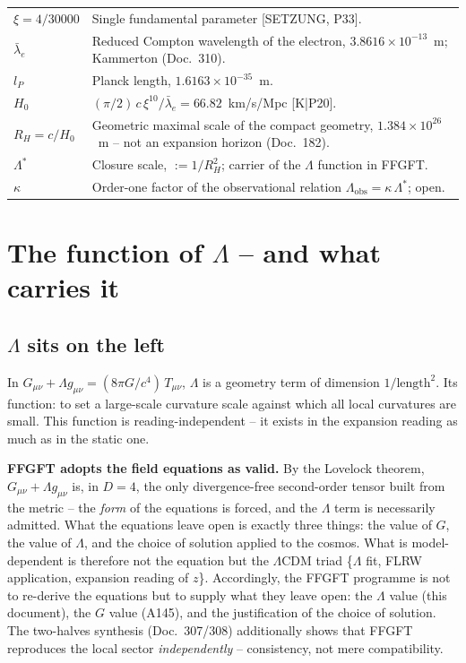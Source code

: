 \medskip
\begin{tabular}{@{}lp{10.5cm}}
$\xi = 4/30000$ & Single fundamental parameter [SETZUNG, P33]. \\[4pt]
$\bar\lambda_e$ & Reduced Compton wavelength of the electron,
                  $3.8616\times10^{-13}$~m; Kammerton (Doc.~310). \\[4pt]
$l_P$           & Planck length, $1.6163\times10^{-35}$~m. \\[4pt]
$H_0$           & $(\pi/2)\,c\,\xi^{10}/\bar\lambda_e
                   = 66.82$~km/s/Mpc [K|P20]. \\[4pt]
$R_H = c/H_0$   & Geometric maximal scale of the compact geometry,
                  $1.384\times10^{26}$~m -- not an expansion horizon
                  (Doc.~182). \\[4pt]
$\Lambda^{*}$   & Closure scale, $:= 1/R_H^2$; carrier of the
                  $\Lambda$ function in FFGFT. \\[4pt]
$\kappa$        & Order-one factor of the observational relation
                  $\Lambda_\text{obs} = \kappa\,\Lambda^{*}$; open. \\
\end{tabular}

\chapter{The function of $\Lambda$ -- and what carries it}
\label{ch:funktion}

\section{$\Lambda$ sits on the left}
\label{sec:links}

In $G_{\mu\nu} + \Lambda g_{\mu\nu} = (8\pi G/c^4)\,T_{\mu\nu}$,
$\Lambda$ is a geometry term of dimension $1/\text{length}^2$. Its
function: to set a large-scale curvature scale against which all
local curvatures are small. This function is reading-independent --
it exists in the expansion reading as much as in the static one.

\textbf{FFGFT adopts the field equations as valid.} By the Lovelock
theorem, $G_{\mu\nu} + \Lambda g_{\mu\nu}$ is, in $D=4$, the only
divergence-free second-order tensor built from the metric -- the
\emph{form} of the equations is forced, and the $\Lambda$ term is
necessarily admitted. What the equations leave open is exactly three
things: the value of $G$, the value of $\Lambda$, and the choice of
solution applied to the cosmos. What is model-dependent is therefore
not the equation but the $\Lambda$CDM triad
\{$\Lambda$ fit, FLRW application, expansion reading of $z$\}.
Accordingly, the FFGFT programme is not to re-derive the equations
but to supply what they leave open: the $\Lambda$ value (this
document), the $G$ value (A145), and the justification of the choice
of solution. The two-halves synthesis (Doc.~307/308) additionally
shows that FFGFT reproduces the local sector \emph{independently} --
consistency, not mere compatibility.

